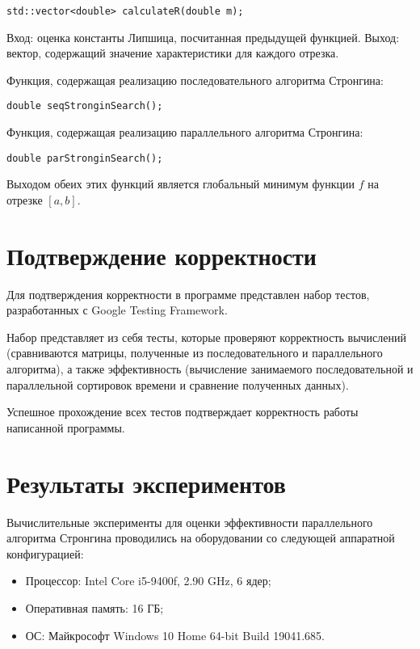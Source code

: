 \documentclass{report}
\begin{document}
\begin{lstlisting}
std::vector<double> calculateR(double m);
\end{lstlisting}
\par Вход: оценка константы Липшица, посчитанная предыдущей функцией. Выход: вектор, содержащий значение характеристики для каждого отрезка.
\par Функция, содержащая реализацию последовательного алгоритма Стронгина:
\begin{lstlisting}
double seqStronginSearch();
\end{lstlisting}
\par Функция, содержащая реализацию параллельного алгоритма Стронгина:
\begin{lstlisting}
double parStronginSearch();
\end{lstlisting}
\par Выходом обеих этих функций является глобальный минимум функции $f$ на отрезке $[a, b]$.
\newpage

\section*{Подтверждение корректности}
Для подтверждения корректности в программе представлен набор тестов, разработанных с Google Testing Framework.
\par Набор представляет из себя тесты, которые проверяют корректность вычислений (сравниваются матрицы, полученные из последовательного и параллельного алгоритма), а также эффективность (вычисление занимаемого последовательной и параллельной сортировок времени и сравнение полученных данных).
\par Успешное прохождение всех тестов подтверждает корректность работы написанной программы.
\newpage

\section*{Результаты экспериментов}
Вычислительные эксперименты для оценки эффективности параллельного алгоритма Стронгина проводились на оборудовании со следующей аппаратной конфигурацией:

\begin{itemize}
\item Процессор: Intel Core i5-9400f, 2.90 GHz, 6 ядер;
\item Оперативная память: 16 ГБ;
\item ОС: Майкрософт Windows 10 Home 64-bit Build 19041.685.
\end{itemize}
\end{document}
